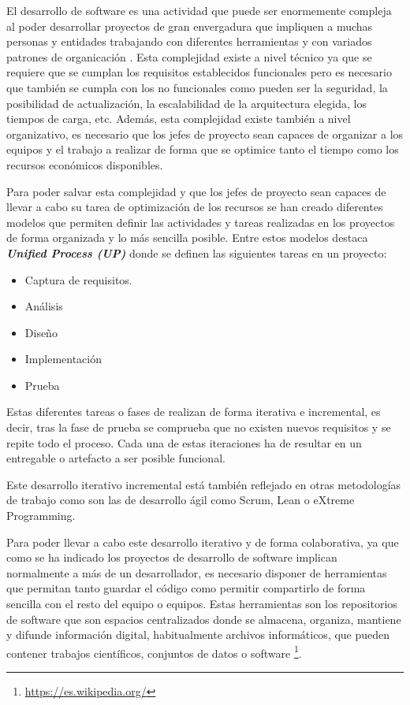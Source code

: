 

El desarrollo de software es una actividad que puede ser enormemente compleja al poder desarrollar proyectos de gran envergadura que impliquen a muchas personas y entidades trabajando con diferentes herramientas y con variados patrones de organicación \cite{jacobson_proceso_2000}. Esta complejidad existe a nivel técnico ya que se requiere que se cumplan los requisitos establecidos funcionales pero es necesario que también se cumpla con los no funcionales como pueden ser la seguridad, la posibilidad de actualización, la escalabilidad de la arquitectura elegida, los tiempos de carga, etc.
Además, esta complejidad existe también a nivel organizativo, es necesario que los jefes de proyecto sean capaces de organizar a los equipos y el trabajo a realizar de forma que se optimice tanto el tiempo como los recursos económicos disponibles.

Para poder salvar esta complejidad y que los jefes de proyecto sean capaces de llevar a cabo su tarea de optimización de los recursos se han creado diferentes modelos que permiten definir las actividades y tareas realizadas en los proyectos de forma organizada y lo más sencilla posible. Entre estos modelos destaca \textit{\textbf{Unified Process (UP)}} \cite{jacobson_proceso_2000} donde se definen las siguientes tareas en un proyecto: 

\begin{itemize}
	\item Captura de requisitos.
	\item Análisis
	\item Diseño
	\item Implementación
	\item Prueba
\end{itemize}

Estas diferentes tareas o fases de realizan de forma iterativa e incremental, es decir, tras la fase de prueba se comprueba que no existen nuevos requisitos y se repite todo el proceso. Cada una de estas iteraciones ha de resultar en un entregable o artefacto a ser posible funcional.

Este desarrollo iterativo incremental está también reflejado en otras metodologías de trabajo como son las de desarrollo ágil como Scrum, Lean o eXtreme Programming.


Para poder llevar a cabo este desarrollo iterativo y de forma colaborativa, ya que como se ha indicado los proyectos de desarrollo de software implican normalmente a más de un desarrollador, es necesario disponer de herramientas que permitan tanto guardar el código como permitir compartirlo de forma sencilla con el resto del equipo o equipos. Estas herramientas son los repositorios de software que son espacios centralizados donde se almacena, organiza, mantiene y difunde información digital, habitualmente archivos informáticos, que pueden contener trabajos científicos, conjuntos de datos o software \footnote{\url{https://es.wikipedia.org/}}. 

